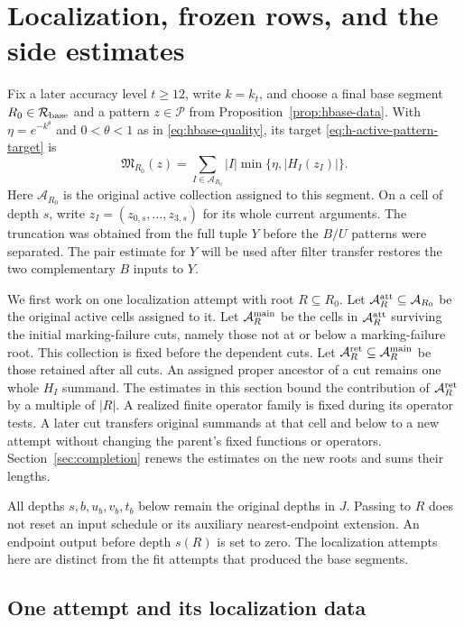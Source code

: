 \section{Localization, frozen rows, and the side estimates}
\label{sec:localization}

Fix a later accuracy level \(t\ge12\), write \(k=k_t\), and choose a
final base segment \(R_0\in\mathcal R_{\rm base}\) and a pattern
\(z\in\mathcal P\) from Proposition~\ref{prop:hbase-data}.  With
\(\eta=e^{-k^\theta}\) and \(0<\theta<1\) as in
\eqref{eq:hbase-quality}, its target \eqref{eq:h-active-pattern-target} is
\[
 \mathfrak M_{R_0}(z)=\sum_{I\in\mathcal A_{R_0}}|I|
       \min\{\eta,|H_I(z_I)|\}.
\]
Here \(\mathcal A_{R_0}\) is the original active collection assigned
to this segment.  On a cell of depth \(s\), write
\(z_I=(z_{0,s},\ldots,z_{3,s})\) for its whole current arguments.
The truncation was obtained from the full tuple
\(Y\) before the \(B/U\) patterns were separated.  The pair estimate
for \(Y\) will be used after filter transfer restores the two complementary
\(B\) inputs to \(Y\).

We first work on one localization attempt with root \(R\subseteq R_0\).
Let \(\mathcal A_R^{\rm att}\subseteq\mathcal A_{R_0}\) be the original
active cells assigned to it.  Let \(\mathcal A_R^{\rm main}\) be
the cells in \(\mathcal A_R^{\rm att}\) surviving the initial
marking-failure cuts, namely those not at or below a marking-failure
root.  This collection is fixed before the dependent cuts.  Let
\(\mathcal A_R^{\rm ret}\subseteq\mathcal A_R^{\rm main}\) be those
retained after all cuts.  An assigned proper ancestor of a cut remains one
whole \(H_I\) summand.  The estimates in this section bound
the contribution of \(\mathcal A_R^{\rm ret}\) by a multiple of
\(|R|\).  A realized finite operator family is fixed during its
operator tests.  A later cut transfers original summands at that cell
and below to a new attempt without changing the parent's fixed
functions or operators.  Section~\ref{sec:completion} renews the
estimates on the new roots and sums their lengths.

All depths \(s,b,u_b,v_b,t_b\) below remain the original depths in
\(J\).  Passing to \(R\) does not reset an input schedule or its
auxiliary nearest-endpoint extension.  An endpoint output before
depth \(s(R)\) is set to zero.  The localization attempts here are
distinct from the fit attempts that produced the base segments.

\subsection{One attempt and its localization data}

